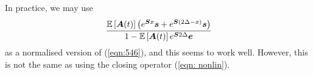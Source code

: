 	In practice, we may use 
	\begin{align}
		\cfrac{\mathbb E\left[\boldsymbol A(t)\right] \left(e^{ \boldsymbol{S}x} \boldsymbol s + e^{ \boldsymbol{S}(2\Delta-x)} \boldsymbol s\right)}{1-\mathbb E\left[\boldsymbol A(t)\right] e^{\boldsymbol S 2\Delta}\boldsymbol e}
	\end{align}
	as a normalised version of (\ref{eqn:546}), and this seems to work well. However, this is not the same as using the closing operator (\ref{eqn: nonlin}).

	

